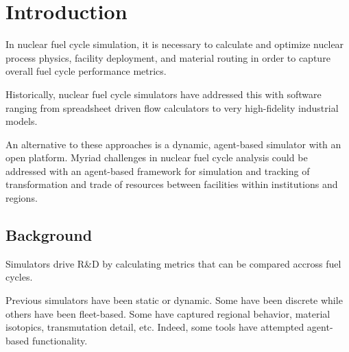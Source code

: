
\section{Introduction}


In nuclear fuel cycle simulation, it is necessary to calculate and optimize 
nuclear process physics, facility deployment, and material routing in order to 
capture overall fuel cycle performance metrics.  

Historically, nuclear fuel cycle simulators have addressed this with software 
ranging from spreadsheet driven flow calculators to very high-fidelity industrial 
models. 

An alternative to these approaches is a dynamic, agent-based simulator with an 
open platform.  Myriad challenges in nuclear fuel cycle analysis could be 
addressed with an agent-based framework for simulation and tracking of 
transformation and trade of resources between facilities within institutions 
and regions.  

\subsection{Background}



Simulators drive R\&D by calculating metrics that can be compared accross fuel 
cycles. 

Previous simulators have been static or dynamic. Some have been discrete while 
others have been fleet-based. Some have captured regional behavior, material 
isotopics, transmutation detail, etc. Indeed, some tools have attempted 
agent-based functionality.

